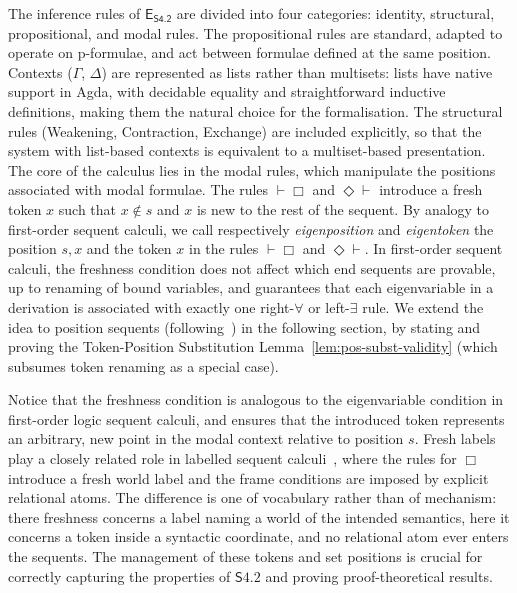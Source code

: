 \documentclass{article}
\newcommand{\logic}{\mathsf{S4.2}}
\newcommand{\agda}{\textsf{Agda}}
\theoremstyle{definition}
\begin{document}
The inference rules of $\mathsf{E}_{{\textsf{S4.2}}}$ are divided into four categories: identity, structural, propositional, and modal rules. The propositional rules are standard, adapted to operate on p-formulae, and act between formulae defined at the same position. Contexts ($\Gamma$, $\Delta$) are represented as lists rather than multisets: lists have native support in \agda, with decidable equality and straightforward inductive definitions, making them the natural choice for the formalisation. The structural rules (Weakening, Contraction, Exchange) are included explicitly, so that the system with list-based contexts is equivalent to a multiset-based presentation. The core of the calculus lies in the modal rules, which manipulate the positions associated with modal formulae.
The rules $\vdash \Box$ and $\Diamond \vdash$ introduce a fresh token $x$ such that $x \notin s$ and $x$ is new to the rest of the sequent. By analogy to first-order sequent calculi, we call respectively \emph{eigenposition} and \emph{eigentoken} the position $s,x$ and the token $x$ in the rules  $\vdash \Box$ and $\Diamond \vdash$.
In first-order sequent calculi, the freshness condition does not affect which end sequents are provable, up to renaming of bound variables, and guarantees that each eigenvariable in a derivation is associated with exactly one right-$\forall$ or left-$\exists$ rule.
We extend the idea to position sequents (following~\cite{Martini2023:CutElimination}) in the following section, by stating and proving the Token-Position Substitution Lemma~\ref{lem:pos-subst-validity} (which subsumes token renaming as a special case).


 


Notice that the freshness condition is analogous to the eigenvariable condition in first-order logic sequent calculi, and ensures that the introduced token represents an arbitrary, new point in the modal context relative to position $s$. Fresh labels play a closely related role in labelled sequent calculi~\cite{Vigano1997:LabelledLogics,Negri:2011}, where the rules for $\Box$ introduce a fresh world label and the frame conditions are imposed by explicit relational atoms. The difference is one of vocabulary rather than of mechanism: there freshness concerns a label naming a world of the intended semantics, here it concerns a token inside a syntactic coordinate, and no relational atom ever enters the sequents. The management of these tokens and set positions is crucial for correctly capturing the properties of $\logic$ and proving proof-theoretical results.
\end{document}
